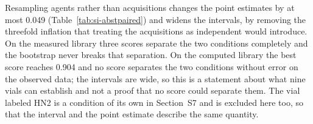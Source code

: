\begin{table}[htbp]
\centering
\caption{Separation between the class-present and the class-absent condition, with the agent as the resampling unit. Intervals are 5000 bootstrap replicates over agents.}
\label{tab:si-aucci}
\footnotesize
{}

\begin{flushleft}\footnotesize Resampling agents rather than acquisitions changes the point estimates by at most 0.049 (Table~\ref{tab:si-abstpaired}) and widens the intervals, by removing the threefold inflation that treating the acquisitions as independent would introduce. On the measured library three scores separate the two conditions completely and the bootstrap never breaks that separation. On the computed library the best score reaches 0.904 and no score separates the two conditions without error on the observed data; the intervals are wide, so this is a statement about what nine vials can establish and not a proof that no score could separate them. The vial labeled HN2 is a condition of its own in Section~S7 and is excluded here too, so that the interval and the point estimate describe the same quantity.\end{flushleft}
\end{table}
